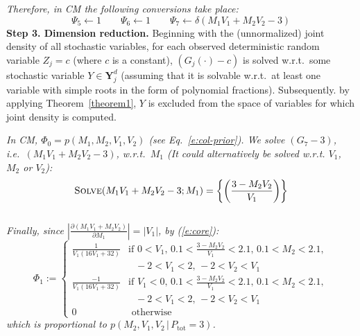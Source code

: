 \documentclass[]{article}
\newcommand{\bvec}[1]{\textbf{#1}}
\newcommand{\otherwise}[1]{#1 &\text{ otherwise}}
\newcommand{\pr}{p}
\begin{document}
\emph{Therefore, in CM the following conversions take place:}
\[
\Psi_5 \leftarrow 1 \qquad 
\Psi_6 \leftarrow 1
\qquad \Psi_7 \leftarrow
\delta(M_1 V_1 + M_2 V_2 - 3)
\]  
{\bf Step 3. Dimension reduction.}
Beginning with the (unnormalized) joint density of all stochastic variables,
for each observed deterministic random variable $Z_j = c$ (where $c$ is a constant),
$(G_j(\cdot) - c)$ is solved w.r.t.\ some stochastic variable 
$Y  \in \bvec{Y}_j^d$ (assuming that it is solvable  
w.r.t.\ at least one variable with simple roots in the form of polynomial fractions).
Subsequently. by applying Theorem~\ref{theorem1}, $Y$ is excluded from the space of variables for which joint density is computed.

\emph{In CM,  
{\footnotesize$\Phi_0 = \pr(M_1, M_2, V_1, V_2)$} (see Eq.~\ref{e:col-prior}).
We solve  
{\footnotesize$(G_7 - 3)$}, i.e.\ 
{\footnotesize$(M_1 V_1 + M_2 V_2 - 3)$}, w.r.t.\ 
{\footnotesize $M_1$}  
(It could alternatively be solved w.r.t. 
{\footnotesize$V_1$}, 
{\footnotesize$M_2$} or 
{\footnotesize$V_2$}):\\\vspace{-1mm}
{\footnotesize 
\begin{equation}
\label{e:example.solve}
\textsc{Solve}(M_1 V_1 + M_2 V_2 - 3; M_1) = \left\{\left(\frac{3 - M_2 V_2}{V_1}\right)\right\}
\end{equation}
}\\\vspace{-1mm}
Finally, since  
{\footnotesize$\left| \frac{\partial (M_1 V_1 + M_2 V_2)}{\partial M_1} \right| = |V_1|$}, by (\ref{e:core}):
{\footnotesize
\begin{equation}  
\label{e:col-prior2}
\Phi_1 :=
\begin{cases}
\frac{1}{V_1(16 V_1 + 32)} &{\text{if }\scriptstyle 0<V_1, \, 0.1<\frac{3-M_2 V_2}{V_1}<2.1, \, 0.1<M_2<2.1,}\\
							 &{\;\;\, \scriptstyle -2<V_1<2, \, -2<V_2 < V_1}\\
\frac{-1}{V_1(16 V_1 + 32)} &{\text{if }\scriptstyle V_1<0, \, 0.1<\frac{3-M_2 V_2}{V_1}<2.1, \, 0.1<M_2<2.1,}\\
							 &{\;\;\, \scriptstyle -2<V_1<2, \, -2<V_2 < V_1}\\
 \otherwise{0}
 \end{cases}
\end{equation}
}
which is proportional to $\pr(M_2, V_1, V_2 \,|\, P_\text{tot} = 3)$.
} %
\end{document}
